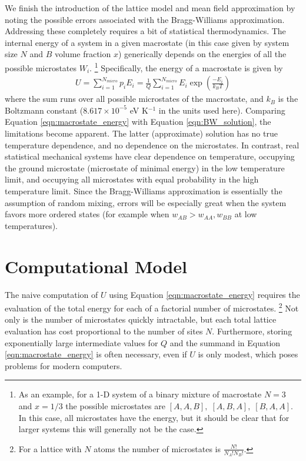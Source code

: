 \documentclass[10pt]{article}
\begin{document}
We finish the introduction of the lattice model and mean field approximation by noting the possible errors associated with the Bragg-Williams approximation.
Addressing these completely requires a bit of statistical thermodynamics.
The internal energy of a system in a given macrostate (in this case given by system size $N$ and $B$ volume fraction $x$) generically depends on the energies of all the possible microstates $W_i$. \footnote{As an example, for a 1-D system of a binary mixture of macrostate $N=3$ and $x=1/3$ the possible microstates are $[A,A,B],\; [A,B,A],\; [B,A,A]$. In this case, all microstates have the energy, but it should be clear that for larger systems this will generally not be the case.}
Specifically, the energy of a macrostate is given by
\begin{align}
    U = \sum_{i=1}^{N_{micro}} p_i E_i
    = \frac{1}{Q} \sum_{i=1}^{N_{micro}} E_i \exp\left(\frac{-E_i}{k_B T}\right)
    \label{eqn:macrostate_energy}
\end{align}
where the sum runs over all possible microstates of the macrostate, and $k_B$ is the Boltzmann constant ($8.617 \times 10^{-5}$ eV K$^{-1}$ in the units used here).
Comparing Equation \ref{eqn:macrostate_energy} with Equation \ref{eqn:BW_solution}, the limitations become apparent.
The latter (approximate) solution has no true temperature dependence, and no dependence on the microstates.
In contrast, real statistical mechanical systems have clear dependence on temperature, occupying the ground microstate (microstate of minimal energy) in the low temperature limit, and occupying all microstates with equal probability in the high temperature limit.
Since the Bragg-Williams approximation is essentially the assumption of random mixing, errors will be especially great when the system favors more ordered states (for example when $w_{AB}>w_{AA},w_{BB}$ at low temperatures).

\section{Computational Model}

The naive computation of $U$ using Equation \ref{eqn:macrostate_energy} requires the evaluation of the total energy for each of a factorial number of microstates. \footnote{For a lattice with $N$ atoms the number of microstates is $\frac{N!}{N_A!N_B!}$.}
Not only is the number of microstates quickly intractable, but each total lattice evaluation has cost proportional to the number of sites $N$. 
Furthermore, storing exponentially large intermediate values for $Q$ and the summand in Equation \ref{eqn:macrostate_energy} is often necessary, even if $U$ is only modest, which poses problems for modern computers.
\end{document}
